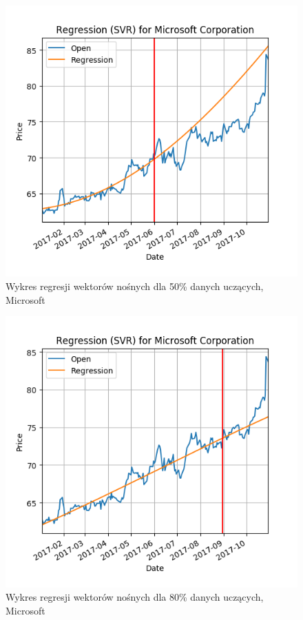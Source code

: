 \begin{figure}[h!]
\centering
\includegraphics[width=150mm]{pictures/plots/microsoft_svr_50.png}
\caption{Wykres regresji wektorów nośnych dla 50\% danych uczących, Microsoft}
\label{fig:Wykres regresji wektorów nośnych dla 50\% danych uczących, Microsoft}
\end{figure}

\begin{figure}[h!]
\centering
\includegraphics[width=150mm]{pictures/plots/microsoft_svr_80.png}
\caption{Wykres regresji wektorów nośnych dla 80\% danych uczących, Microsoft}
\label{fig:Wykres regresji wektorów nośnych dla 80\% danych uczących, Microsoft}
\end{figure}

